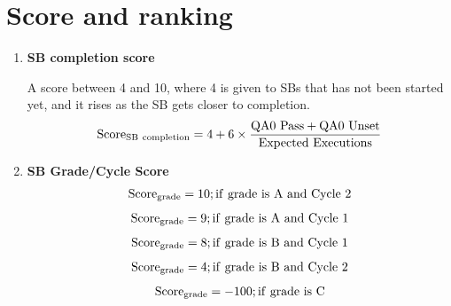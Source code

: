\documentclass[a4paper,10pt,english]{sphinxmanual}
\begin{document}
\section{Score and ranking}
\label{algorithm:score}\label{algorithm:score-and-ranking}\begin{enumerate}
\item {} 
\textbf{SB completion score}

A score between 4 and 10, where 4 is given to SBs that has not been started
yet, and it rises as the SB gets closer to completion.
\begin{gather}
\begin{split}\rm{Score}_{\rm{SB\ completion}} =
4 + 6 \times \frac{\rm{QA0\ Pass} + \rm{QA0\ Unset}}{\rm{Expected\ Executions}}\end{split}\notag
\end{gather}
\item {} 
\textbf{SB Grade/Cycle Score}
\label{algorithm:equation-gA}\begin{gather}
\begin{split}\rm{Score}_{\rm{grade}} = 10 ; \rm{if\ grade\ is\ A\ and\ Cycle\ 2}\end{split}\label{algorithm-gA}
\end{gather}\begin{gather}
\begin{split}\rm{Score}_{\rm{grade}} = 9 ; \rm{if\ grade\ is\ A\ and\ Cycle\ 1}\end{split}\notag
\end{gather}\label{algorithm:equation-gBc1}\begin{gather}
\begin{split}\rm{Score}_{\rm{grade}} = 8  ; \rm{if\ grade\ is\ B\ and\ Cycle\ 1}\end{split}\label{algorithm-gBc1}
\end{gather}\label{algorithm:equation-gBc2}\begin{gather}
\begin{split}\rm{Score}_{\rm{grade}} = 4  ; \rm{if\ grade\ is\ B\ and\ Cycle\ 2}\end{split}\label{algorithm-gBc2}
\end{gather}\label{algorithm:equation-gC}\begin{gather}
\begin{split}\rm{Score}_{\rm{grade}} = -100 ; \rm{if\ grade\ is\ C}\end{split}\label{algorithm-gC}
\end{gather}

\end{enumerate}
\end{document}
